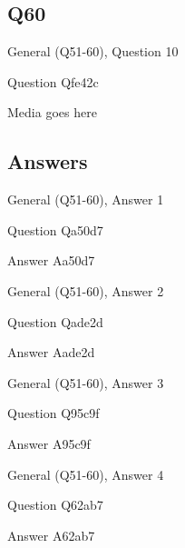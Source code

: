 \documentclass[11pt]{beamer}
\begin{document}
\subsection*{Q60}
\begin{frame}[t]{General (Q51-60), Question 10}
\vspace{2em}
\begin{block}{Question}
Qfe42c
\end{block}
\begin{center}
Media goes here
\end{center}
\end{frame}
    
\subsection{Answers}

\begin{frame}[t]{General (Q51-60), Answer 1}
\vspace{2em}
\begin{block}{Question}
Qa50d7
\end{block}
\pause{}
\begin{block}{Answer}
Aa50d7
\end{block}
\end{frame}
    

\begin{frame}[t]{General (Q51-60), Answer 2}
\vspace{2em}
\begin{block}{Question}
Qade2d
\end{block}
\pause{}
\begin{block}{Answer}
Aade2d
\end{block}
\end{frame}
    

\begin{frame}[t]{General (Q51-60), Answer 3}
\vspace{2em}
\begin{block}{Question}
Q95c9f
\end{block}
\pause{}
\begin{block}{Answer}
A95c9f
\end{block}
\end{frame}
    

\begin{frame}[t]{General (Q51-60), Answer 4}
\vspace{2em}
\begin{block}{Question}
Q62ab7
\end{block}
\pause{}
\begin{block}{Answer}
A62ab7
\end{block}
\end{frame}
    
\end{document}

